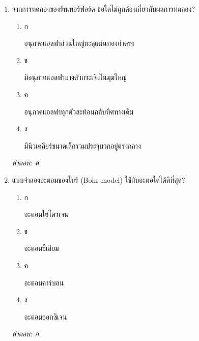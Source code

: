 \documentclass[12pt]{article}
\begin{document}
\begin{enumerate}[label=\arabic*., itemsep=0.5\baselineskip, topsep=0.5\baselineskip, leftmargin=*]
\item จากการทดลองของรัทเทอร์ฟอร์ด ข้อใดไม่ถูกต้องเกี่ยวกับผลการทดลอง?
\begin{enumerate}[label=\alph*)., itemsep=0.3\baselineskip, topsep=0.3\baselineskip]
\item ก\ 
\begin{minipage}[t]{0.9\linewidth}
\raggedright อนุภาคแอลฟาส่วนใหญ่ทะลุแผ่นทองคำตรง
\end{minipage}
\item ข\ 
\begin{minipage}[t]{0.9\linewidth}
\raggedright มีอนุภาคแอลฟาบางตัวกระเจิงในมุมใหญ่
\end{minipage}
\item ค\ 
\begin{minipage}[t]{0.9\linewidth}
\raggedright อนุภาคแอลฟาทุกตัวสะท้อนกลับทิศทางเดิม
\end{minipage}
\item ง\ 
\begin{minipage}[t]{0.9\linewidth}
\raggedright มีนิวเคลียร์ขนาดเล็กรวมประจุบวกอยู่ตรงกลาง
\end{minipage}
\end{enumerate}
\vspace{-0.3\baselineskip}
\begin{small}
\textit{คำตอบ: ค}
\end{small}

\item แบบจำลองอะตอมของโบร์ (Bohr model) ใช้กับอะตอใดได้ดีที่สุด?
\begin{enumerate}[label=\alph*)., itemsep=0.3\baselineskip, topsep=0.3\baselineskip]
\item ก\ 
\begin{minipage}[t]{0.9\linewidth}
\raggedright อะตอมไฮโดรเจน
\end{minipage}
\item ข\ 
\begin{minipage}[t]{0.9\linewidth}
\raggedright อะตอมฮีเลียม
\end{minipage}
\item ค\ 
\begin{minipage}[t]{0.9\linewidth}
\raggedright อะตอมคาร์บอน
\end{minipage}
\item ง\ 
\begin{minipage}[t]{0.9\linewidth}
\raggedright อะตอมออกซิเจน
\end{minipage}
\end{enumerate}
\vspace{-0.3\baselineskip}
\begin{small}
\textit{คำตอบ: ก}
\end{small}


\end{enumerate}
\end{document}
